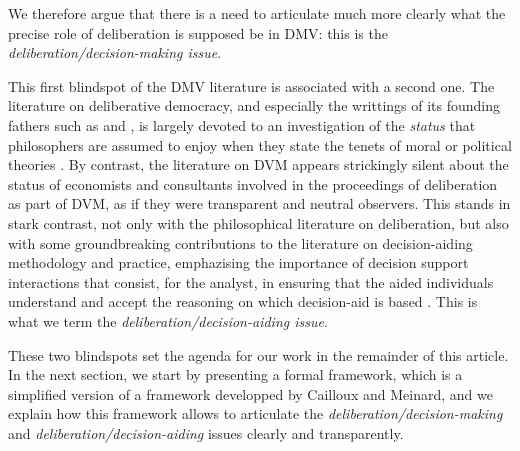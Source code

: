 \documentclass[version=last, pagesize, twoside=off, bibliography=totoc, DIV=calc, fontsize=14pt, a4paper, french, english]{scrartcl}
\begin{document}
We therefore argue that there is a need to articulate much more clearly what the precise role of deliberation is supposed be in DMV: this is the \emph{deliberation/decision-making issue}.

This first blindspot of the DMV literature is associated with a second one. The literature on deliberative democracy, and especially the writtings of its founding fathers such as \citet{rawls_political_2005} and \citet{habermas_faktizitat_1992}, is largely devoted to an investigation of the \emph{status} that philosophers are assumed to enjoy when they state the tenets of moral or political theories \citep{meinard_du_2014}. By contrast, the literature on DVM appears strickingly silent about the status of economists and consultants involved in the proceedings of deliberation as part of DVM, as if they were transparent and neutral observers. This stands in stark contrast, not only with the philosophical literature on deliberation, but also with some groundbreaking contributions to the literature on decision-aiding methodology and practice, emphazising the importance of decision support interactions that consist, for the analyst, in ensuring that the aided individuals understand and accept the reasoning on which decision-aid is based \citep{roy_multicriteria_1996}. This is what we term the \emph{deliberation/decision-aiding issue}.

These two blindspots set the agenda for our work in the remainder of this article. In the next section, we start by presenting a formal framework, which is a simplified version of a framework developped by Cailloux and Meinard, and we explain how this framework allows to articulate the \emph{deliberation/decision-making} and \emph{deliberation/decision-aiding} issues clearly and transparently.
\end{document}
